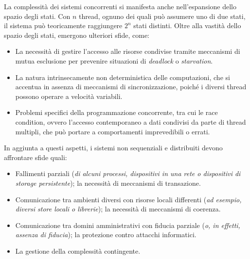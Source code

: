La complessità dei sistemi concorrenti si manifesta anche
nell'espansione dello spazio degli stati. Con \( n \) thread,
ognuno dei quali può assumere uno di due stati, il sistema può
teoricamente raggiungere \( 2^n \) stati distinti. Oltre alla
vastità dello spazio degli stati, emergono ulteriori sfide, come:
\begin{itemize}
    \item La necessità di gestire l'accesso alle risorse condivise
    tramite meccanismi di mutua esclusione per prevenire situazioni
    di \textit{deadlock} o \textit{starvation}.
    \item La natura intrinsecamente non deterministica delle
    computazioni, che si accentua in assenza di meccanismi di
    sincronizzazione, poiché i diversi thread possono operare
    a velocità variabili.
    \item Problemi specifici della programmazione concorrente,
    tra cui le race condition, ovvero l'accesso contemporaneo
    a dati condivisi da parte di thread multipli, che può portare
    a comportamenti imprevedibili o errati.
\end{itemize}
In aggiunta a questi aspetti, i sistemi non sequenziali e
distribuiti devono affrontare sfide quali:
\begin{itemize}
    \item Fallimenti parziali (\textit{di alcuni processi, dispositivi
    in una rete o dispositivi di storage persistente}); la necessità
    di meccanismi di transazione.
    \item Comunicazione tra ambienti diversi con risorse locali
    differenti (\textit{ad esempio, diversi store locali o librerie}); la
    necessità di meccanismi di coerenza.
    \item Comunicazione tra domini amministrativi con fiducia parziale
    (\textit{o, in effetti, assenza di fiducia}); la protezione contro
    attacchi informatici.
    \item La gestione della complessità contingente.
\end{itemize}

